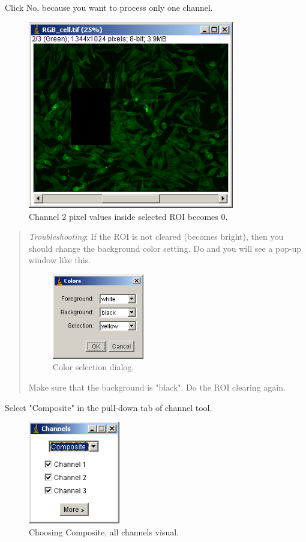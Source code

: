 \begin{indentexercise}{1}
Click No, because you want to process only one channel. 
\begin{figure}[H]
\begin{center}
\includegraphics[width=9cm]{img/CMCIBasicCourse201102-img20.png}
\caption{ Channel 2 pixel values inside selected ROI becomes 0.}
\label{fig:img20}
\end{center}
\end{figure}
\begin{quote}
\textit{Troubleshooting}: If the ROI is not cleared (becomes bright), then you should change the background color setting. Do  and you will see a pop-up window like this. 
\begin{figure}[H]
\begin{center}
\includegraphics[width=4cm]{img/CMCIBasicCourse201102-img21.png}
\caption{ Color selection dialog.}
\label{fig:img21}
\end{center}
\end{figure}

Make sure that the background is "black". Do the ROI clearing again. 
\end{quote}
Select "Composite" in the pull-down tab of channel tool. 
\begin{figure}[H]
\begin{center}
\includegraphics[width=4cm]{img/CMCIBasicCourse201102-img22.png}
\caption{ Choosing Composite, all channels visual.}
\label{fig:img22}
\end{center}
\end{figure}


\end{indentexercise}
